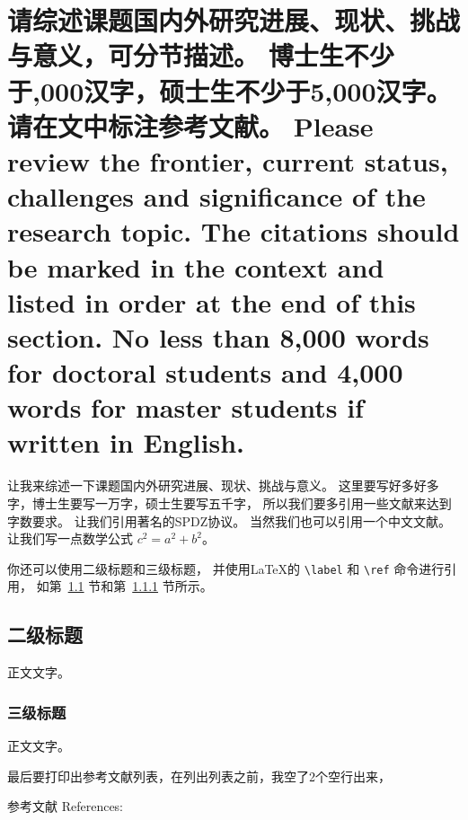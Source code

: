 \documentclass[a4paper,zihao=-4,AutoFakeBold]{ctexart}
\begin{document}


\section{请综述课题国内外研究进展、现状、挑战与意义，可分节描述。
    博士生不少于,000汉字，硕士生不少于5,000汉字。请在文中标注参考文献。 
    Please review the frontier, current status, 
    challenges and significance of the research topic. 
    The citations should be marked in the context 
    and listed in order at the end of this section. 
    No less than 8,000 words for doctoral students 
    and 4,000 words for master students if written in English.}


让我来综述一下课题国内外研究进展、现状、挑战与意义。
这里要写好多好多字，博士生要写一万字，硕士生要写五千字，
所以我们要多引用一些文献来达到字数要求。
让我们引用著名的SPDZ协议\cite{SPDZ}。
当然我们也可以引用一个中文文献\cite{ZJSD}。
让我们写一点数学公式 $c^2 = a^2 + b^2$。

你还可以使用二级标题和三级标题，
并使用\LaTeX 的 \verb|\label| 和 \verb|\ref| 命令进行引用，
如第~\ref{sub} 节和第~\ref{subsub} 节所示。


\subsection{二级标题}\label{sub}
正文文字。

\subsubsection{三级标题}\label{subsub}
正文文字。



最后要打印出参考文献列表，在列出列表之前，我空了2个空行出来，

\vspace{2\baselineskip}
{
    \linespread{1.25}\selectfont%
    参考文献 References: 
    \printbibliography[heading=none]
}
\end{document}
